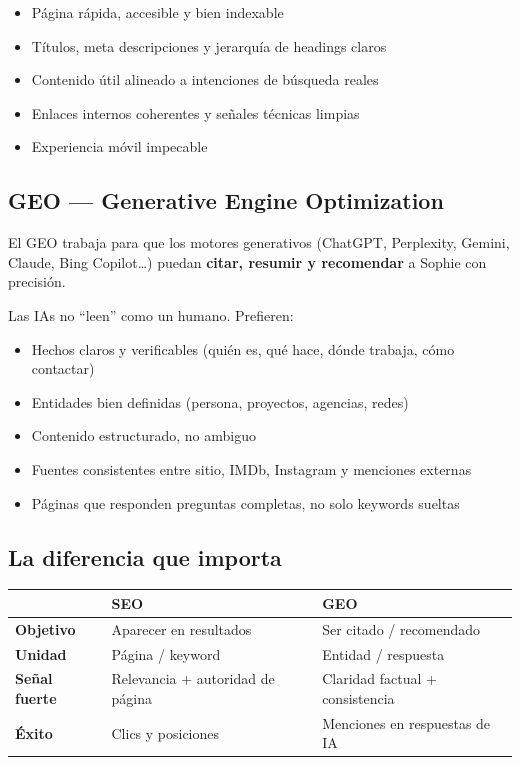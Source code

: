 \documentclass[11pt,a4paper]{article}
\begin{document}
\begin{itemize}
  \item Página rápida, accesible y bien indexable
  \item Títulos, meta descripciones y jerarquía de headings claros
  \item Contenido útil alineado a intenciones de búsqueda reales
  \item Enlaces internos coherentes y señales técnicas limpias
  \item Experiencia móvil impecable
\end{itemize}

\subsection{GEO --- Generative Engine Optimization}
El GEO trabaja para que los motores generativos (ChatGPT, Perplexity, Gemini, Claude, Bing Copilot\ldots)
puedan \textbf{citar, resumir y recomendar} a Sophie con precisión.

Las IAs no ``leen'' como un humano. Prefieren:

\begin{itemize}
  \item Hechos claros y verificables (quién es, qué hace, dónde trabaja, cómo contactar)
  \item Entidades bien definidas (persona, proyectos, agencias, redes)
  \item Contenido estructurado, no ambiguo
  \item Fuentes consistentes entre sitio, IMDb, Instagram y menciones externas
  \item Páginas que responden preguntas completas, no solo keywords sueltas
\end{itemize}

\subsection{La diferencia que importa}
\begin{center}
\renewcommand{\arraystretch}{1.35}
\begin{tabularx}{\textwidth}{@{}>{\sffamily\bfseries}p{3.1cm} X X@{}}
\toprule
{\sffamily\color{mute}\bfseries} & {\sffamily\color{mute}\bfseries SEO} & {\sffamily\color{mute}\bfseries GEO} \\
\midrule
Objetivo & Aparecer en resultados & Ser citado / recomendado \\
Unidad & Página / keyword & Entidad / respuesta \\
Señal fuerte & Relevancia + autoridad de página & Claridad factual + consistencia \\
Éxito & Clics y posiciones & Menciones en respuestas de IA \\
\bottomrule
\end{tabularx}
\end{center}
\end{document}
